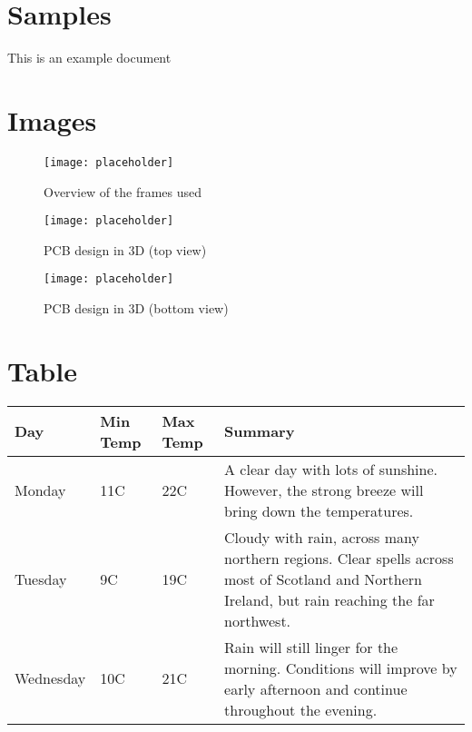 \section{Samples}
This is an example document 
\lipsum[1-3]

\clearpage
\section{Images}
\begin{figure}[H]
	\centering
	\texttt{[image: placeholder]}
	\caption{Overview of the frames used}
	\label{fig:placeholder}
\end{figure}

\begin{multicols}{2}
	\begin{figure}[H]
		\centering
		\texttt{[image: placeholder]}
		\caption{PCB design in 3D (top view)}
		\label{fig:multicol:placeholder1}
	\end{figure}

	\begin{figure}[H]
		\centering
		\texttt{[image: placeholder]}
		\caption{PCB design in 3D (bottom view)}
		\label{fig:multicol:placeholder2}
	\end{figure}
\end{multicols}


\section{Table}
\begin{center}
	\begin{tabular}{ | l | l | l | p{5cm} |}
		\hline
		Day & Min Temp & Max Temp & Summary \\ \hline
		Monday & 11C & 22C & A clear day with lots of sunshine.  
		However, the strong breeze will bring down the temperatures. \\ \hline
		Tuesday & 9C & 19C & Cloudy with rain, across many northern regions. Clear spells 
		across most of Scotland and Northern Ireland, 
		but rain reaching the far northwest. \\ \hline
		Wednesday & 10C & 21C & Rain will still linger for the morning. 
		Conditions will improve by early afternoon and continue 
		throughout the evening. \\
		\hline
	\end{tabular}
\end{center}

